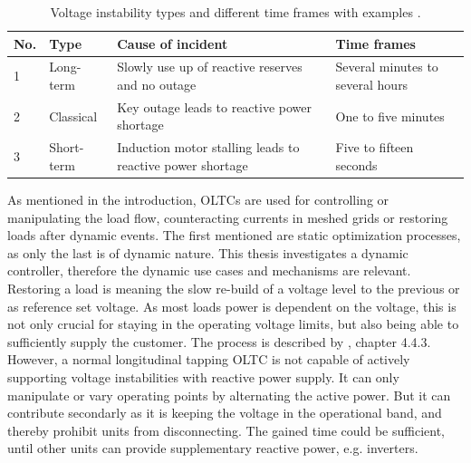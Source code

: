\begin{table}[htbp!]
    \centering
    \caption[Voltage instability types and different time frames]{Voltage instability types and different time frames with examples \autocite{danish_2015}.}
    \small
    \label{tab:voltage-instability-scenarios}
    \renewcommand\tabularxcolumn[1]{m{#1}}
    \vspace*{12pt}
    \begin{tabularx}{\textwidth}{llXX}
        \textbf{No.} & \textbf{Type} & \textbf{Cause of incident} & \textbf{Time frames} \\
        \toprule
        1 & Long-term & Slowly use up of reactive reserves and no outage & Several minutes to several hours \\
        2 & Classical & Key outage leads to reactive power shortage & One to five minutes \\
        3 & Short-term & Induction motor stalling leads to reactive power shortage & Five to fifteen seconds \\
        \bottomrule
    \end{tabularx}
\end{table}

As mentioned in the introduction, \acsp{OLTC} are used for controlling or manipulating the load flow, counteracting currents in meshed grids or restoring loads after dynamic events.
The first mentioned are static optimization processes, as only the last is of dynamic nature.
This thesis investigates a dynamic controller, therefore the dynamic use cases and mechanisms are relevant.
Restoring a load is meaning the slow re-build of a voltage level to the previous or as reference set voltage.
As most loads power is dependent on the voltage, this is not only crucial for staying in the operating voltage limits, but also being able to sufficiently supply the customer.
The process is described by \textcite{cutsem_1998}, chapter 4.4.3.
However, a normal longitudinal tapping \acs{OLTC} is not capable of actively supporting voltage instabilities with reactive power supply.
It can only manipulate or vary operating points by alternating the active power.
But it can contribute secondarly as it is keeping the voltage in the operational band, and thereby prohibit units from disconnecting.
The gained time could be sufficient, until other units can provide supplementary reactive power, e.g. inverters.       

